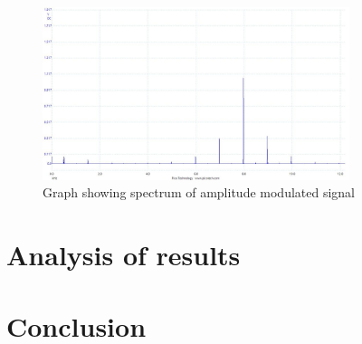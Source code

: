 \documentclass[12pt]{article}
\begin{document}
\begin{figure}[h]
    \centering
    \includegraphics[width=0.8\textwidth]{AmpMod_f.jpg}
    \caption{Graph showing spectrum of amplitude modulated signal}
    \label{fig:freq_responses}
\end{figure}

\section{Analysis of results}




\section{Conclusion}
\end{document}

